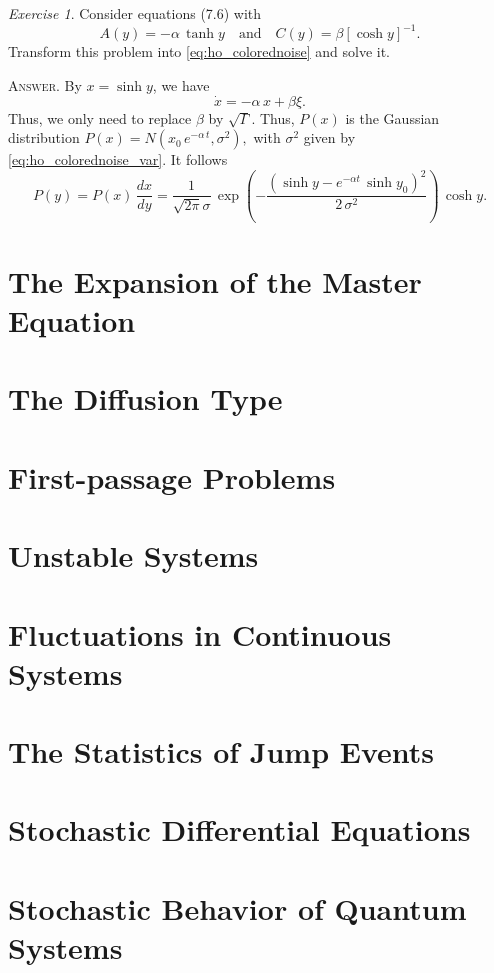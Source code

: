\documentclass{book}
\numberwithin{equation}{section}
\theoremstyle{plain}
\theoremstyle{definition}
\theoremstyle{remark}
\theoremstyle{BoldStyle}
\newtheorem{exercise}{Exercise}
\numberwithin{exercise}{section}
\newcommand{\answer}[1]{{\color{DarkBlue}\footnotesize \textsc{Answer.} #1}}
\begin{document}
\begin{exercise}
  Consider equations (7.6) with
  $$
  A(y) = -\alpha \, \tanh y
  \quad \mathrm{and} \quad
  C(y) = \beta [ \cosh y ]^{-1}.
  $$
  Transform this problem into \eqref{eq:ho_colorednoise} and solve it.

  \answer{
    By $x = \sinh y$, we have
    $$
    \dot x = -\alpha \, x + \beta \xi.
    $$
    Thus, we only need to replace $\beta$ by $\sqrt\Gamma$.
    Thus, $P(x)$ is the Gaussian distribution
    $
    P(x) = N(x_0 \, e^{-\alpha \, t}, \sigma^2),
    $
    with $\sigma^2$ given by \eqref{eq:ho_colorednoise_var}.
    It follows
    $$
    P(y) = P(x) \, \frac{ dx }{ dy }
    = \frac{1}{\sqrt{2\pi} \sigma} \, \exp\left(
      -\frac{ (\sinh y - e^{-\alpha t} \, \sinh y_0)^2 } { 2 \, \sigma^2 }
    \right) \, \cosh y.
    $$
  }
\end{exercise}

\chapter{The Expansion of the Master Equation}

\chapter{The Diffusion Type}

\chapter{First-passage Problems}

\chapter{Unstable Systems}

\chapter{Fluctuations in Continuous Systems}

\chapter{The Statistics of Jump Events}

\chapter{Stochastic Differential Equations}

\chapter{Stochastic Behavior of Quantum Systems}



\end{document}
